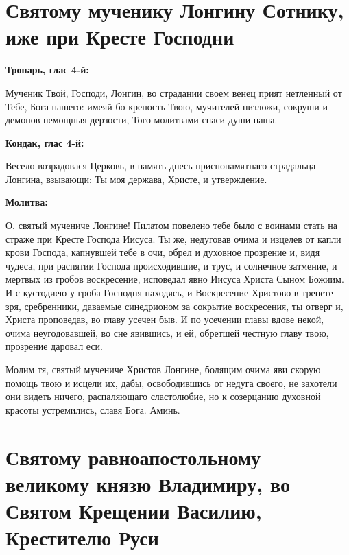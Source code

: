 \medskip\mychapterending


 

\section{Святому мученику Лонгину Сотнику, иже при Кресте Господни}
 


\bfseries Тропарь, глас 4-й:\normalfont{}\nopagebreak


Мученик Твой, Господи, Лонгин,  во страдании своем венец прият нетленный от Тебе, Бога нашего:  имеяй бо крепость Твою,  мучителей низложи, сокруши и демонов немощныя дерзости,  Того молитвами спаси души наша.


\medskip


\bfseries Кондак, глас 4-й:\normalfont{}\nopagebreak


Весело возрадовася Церковь, в память днесь приснопамятнаго страдальца Лонгина, взывающи: Ты моя держава, Христе, и утверждение.


\medskip


\bfseries Молитва:\normalfont{}\nopagebreak


О, святый мучениче Лонгине! Пилатом повелено тебе было с воинами стать на страже при Кресте Господа Иисуса. Ты же, недуговав очима и изцелев от капли крови Господа, капнувшей тебе в очи, обрел и духовное прозрение и, видя чудеса, при распятии Господа происходившие, и трус, и солнечное затмение, и мертвых из гробов воскресение, исповедал явно Иисуса Христа Сыном Божиим. И с кустодиею у гроба Господня находясь, и Воскресение Христово в трепете зря, сребренники, даваемые синедрионом за сокрытие воскресения, ты отверг и, Христа проповедав, во главу усечен быв. И по усечении главы вдове некой, очима неугодовавшей, во сне явившись, и ей, обретшей честную главу твою, прозрение даровал еси. 


Молим тя, святый мучениче Христов Лонгине, болящим  очима яви скорую помощь твою и исцели их, дабы, освободившись от недуга своего, не захотели они видеть ничего, распаляющаго сластолюбие, но к созерцанию духовной красоты устремились, славя Бога. Аминь.


\section{Святому равноапостольному великому князю Владимиру, во Святом Крещении Василию, Крестителю Руси}
 


